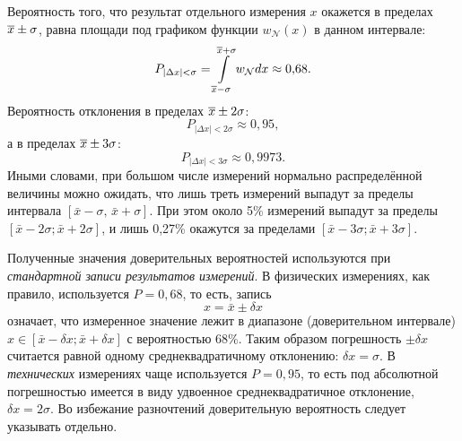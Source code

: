 Вероятность того, что результат отдельного измерения $x$ окажется
в пределах $\overline{x}\pm\sigma$, равна площади под графиком
функции $w_{\mathcal{N}}(x)$ в данном интервале:
\[
P_{\left|\Delta x\right|<\sigma} =
\int\limits_{\overline{x}-\sigma}^{\overline{x}+\sigma}
w_{\mathcal{N}} dx \approx0{,}68.
\]
Вероятность отклонения в пределах $\overline{x}\pm2\sigma$:
\[
P_{\left|\Delta x\right|<2\sigma}\approx0{,}95,
\]
а в пределах $\overline{x}\pm3\sigma$:
\[
P_{\left|\Delta x\right|<3\sigma}\approx0{,}9973.
\]
Иными словами, при большом числе измерений нормально распределённой
величины можно ожидать, что лишь треть измерений выпадут за пределы интервала
$\left[\bar{x}-\sigma,\,\bar{x}+\sigma\right]$. При этом около 5\%
измерений выпадут за пределы $\left[\bar{x}-2\sigma;\bar{x}+2\sigma\right]$,
и лишь 0,27\% окажутся за пределами
$\left[\bar{x}-3\sigma;\bar{x}+3\sigma\right]$.


Полученные значения доверительных вероятностей используются при
\emph{стандартной записи результатов измерений}. В физических измерениях, как правило, используется $P=0{,}68$,
то есть, запись
\[
x=\bar{x}\pm\delta x
\]
означает, что измеренное значение лежит в диапазоне (доверительном
интервале) $x\in\left[\bar{x}-\delta x;\bar{x}+\delta x\right]$ с
вероятностью 68\%. Таким образом погрешность $\pm\delta x$ считается
равной одному среднеквадратичному отклонению: $\delta x=\sigma$.
В \emph{технических} измерениях чаще используется $P=0{,}95$, то есть под
абсолютной погрешностью имеется в виду удвоенное среднеквадратичное
отклонение, $\delta x=2\sigma$. Во избежание разночтений доверительную
вероятность следует указывать отдельно.


